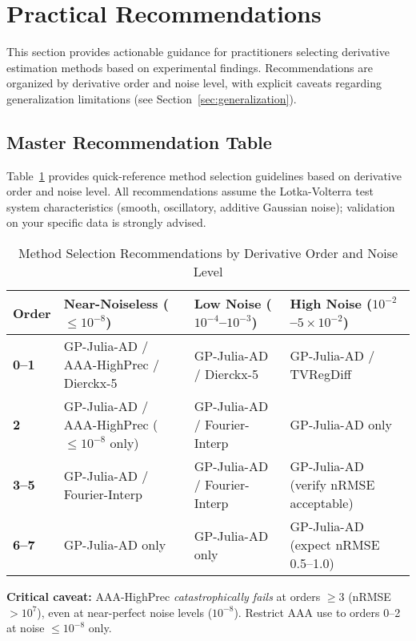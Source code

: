 \section{Practical Recommendations}
\label{sec:recommendations}

This section provides actionable guidance for practitioners selecting derivative estimation methods based on experimental findings. Recommendations are organized by derivative order and noise level, with explicit caveats regarding generalization limitations (see Section~\ref{sec:generalization}).

\subsection{Master Recommendation Table}
\label{sec:master_table}

Table~\ref{tab:recommendations} provides quick-reference method selection guidelines based on derivative order and noise level. All recommendations assume the Lotka-Volterra test system characteristics (smooth, oscillatory, additive Gaussian noise); validation on your specific data is strongly advised.

\begin{table}[htbp]
\centering
\caption{Method Selection Recommendations by Derivative Order and Noise Level}
\label{tab:recommendations}
\small
\begin{tabular}{lp{3.5cm}p{3.5cm}p{3.5cm}}
\toprule
\textbf{Order} & \textbf{Near-Noiseless ($\leq 10^{-8}$)} & \textbf{Low Noise ($10^{-4}$--$10^{-3}$)} & \textbf{High Noise ($10^{-2}$--$5\times 10^{-2}$)} \\
\midrule
\textbf{0--1} & GP-Julia-AD / AAA-HighPrec / Dierckx-5 & GP-Julia-AD / Dierckx-5 & GP-Julia-AD / TVRegDiff \\
\midrule
\textbf{2} & GP-Julia-AD / AAA-HighPrec ($\leq 10^{-8}$ only) & GP-Julia-AD / Fourier-Interp & GP-Julia-AD only \\
\midrule
\textbf{3--5} & GP-Julia-AD / Fourier-Interp & GP-Julia-AD / Fourier-Interp & GP-Julia-AD (verify nRMSE acceptable) \\
\midrule
\textbf{6--7} & GP-Julia-AD only & GP-Julia-AD only & GP-Julia-AD (expect nRMSE 0.5--1.0) \\
\bottomrule
\end{tabular}
\end{table}

\textbf{Critical caveat:} AAA-HighPrec \textit{catastrophically fails} at orders $\geq 3$ (nRMSE $> 10^7$), even at near-perfect noise levels ($10^{-8}$). Restrict AAA use to orders 0--2 at noise $\leq 10^{-8}$ only.


